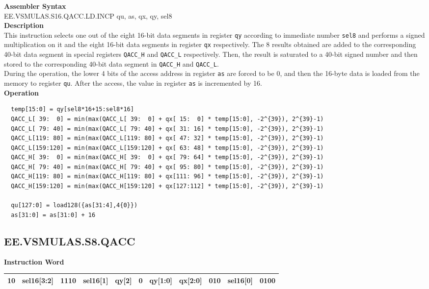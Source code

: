 \textbf{Assembler Syntax} \\
EE.VSMULAS.S16.QACC.LD.INCP qu, as, qx, qy, sel8 \\
\textbf{Description} \\
This instruction selects one out of the eight 16-bit data segments in register \lstinline{qy} according to immediate number \lstinline{sel8} and performs a signed multiplication on it and the eight 16-bit data segments in register \lstinline{qx} respectively. The 8 results obtained are added to the corresponding 40-bit data segment in special registers \lstinline{QACC_H} and \lstinline{QACC_L} respectively. Then, the result is saturated to a 40-bit signed number and then stored to the corresponding 40-bit data segment in \lstinline{QACC_H} and \lstinline{QACC_L}.\\
During the operation, the lower 4 bits of the access address in register \lstinline{as} are forced to be 0, and then the 16-byte data is loaded from the memory to register \lstinline{qu}. After the access, the value in register \lstinline{as} is incremented by 16.\\
\textbf{Operation}
\begin{lstlisting}
  temp[15:0] = qy[sel8*16+15:sel8*16]
  QACC_L[ 39:  0] = min(max(QACC_L[ 39:  0] + qx[ 15:  0] * temp[15:0], -2^{39}), 2^{39}-1)
  QACC_L[ 79: 40] = min(max(QACC_L[ 79: 40] + qx[ 31: 16] * temp[15:0], -2^{39}), 2^{39}-1)
  QACC_L[119: 80] = min(max(QACC_L[119: 80] + qx[ 47: 32] * temp[15:0], -2^{39}), 2^{39}-1)
  QACC_L[159:120] = min(max(QACC_L[159:120] + qx[ 63: 48] * temp[15:0], -2^{39}), 2^{39}-1)
  QACC_H[ 39:  0] = min(max(QACC_H[ 39:  0] + qx[ 79: 64] * temp[15:0], -2^{39}), 2^{39}-1)
  QACC_H[ 79: 40] = min(max(QACC_H[ 79: 40] + qx[ 95: 80] * temp[15:0], -2^{39}), 2^{39}-1)
  QACC_H[119: 80] = min(max(QACC_H[119: 80] + qx[111: 96] * temp[15:0], -2^{39}), 2^{39}-1)
  QACC_H[159:120] = min(max(QACC_H[159:120] + qx[127:112] * temp[15:0], -2^{39}), 2^{39}-1)

  qu[127:0] = load128({as[31:4],4{0}})
  as[31:0] = as[31:0] + 16
\end{lstlisting}

\clearpage
\subsection{EE.VSMULAS.S8.QACC}\label{instruction:EEVSMULASS8QACC}
\setlength\tabcolsep{6pt}
\textbf{Instruction Word} \\
\begin{tabular}{|c|c|c|c|c|c|c|c|c|c|c|}
	\hline
	10 & sel16[3:2] & 1110 & sel16[1] & qy[2] & 0 & qy[1:0] & qx[2:0] & 010 & sel16[0] & 0100 \\
	\hline
\end{tabular}

